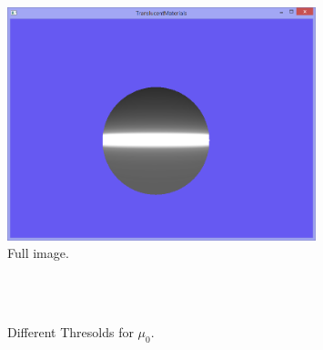 \documentclass[12pt, twoside,a4paper]{article}
\begin{document}
\begin{figure}[here]
\centering
\includegraphics[width=0.8\textwidth]{50}
\caption{Full image.}
\label{fig:ssdiagram}
\end{figure}



\begin{figure}
\centering
{}
\\
\\


\caption{Different Thresolds for $\mu_0$.}
\label{fig:img2}
\end{figure}
\end{document}
